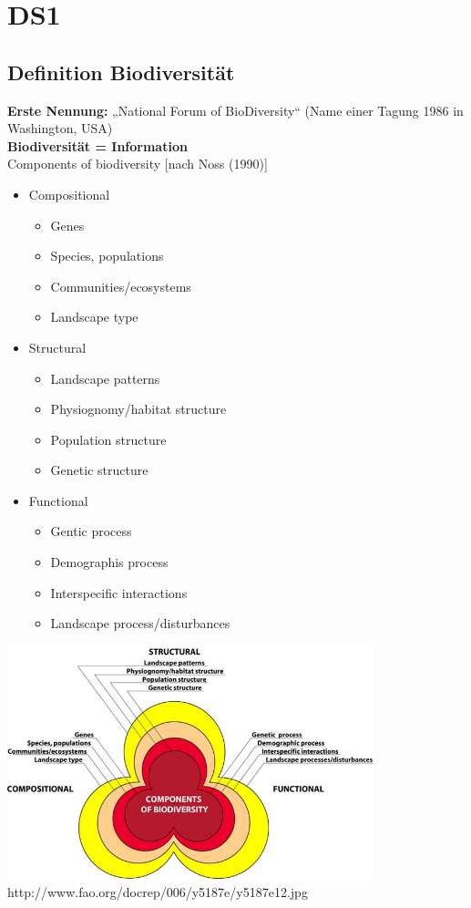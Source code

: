 \section{DS1}
\subsection{Definition Biodiversität}
\textbf{Erste Nennung:} „National Forum of BioDiversity“ (Name einer Tagung 1986 in Washington, USA)\\
\textbf{Biodiversität = Information}\\
Components of biodiversity [nach Noss (1990)]
\begin{itemize}
	\item Compositional
	\begin{itemize}
		\item Genes
		\item Species, populations
		\item Communities/ecosystems
		\item Landscape type
	\end{itemize}
	\item Structural
	\begin{itemize}
		\item Landscape patterns
		\item Physiognomy/habitat structure
		\item Population structure
		\item Genetic structure
	\end{itemize}
	\item Functional
	\begin{itemize}
		\item Gentic process
		\item Demographis process
		\item Interspecific interactions
		\item Landscape process/disturbances
	\end{itemize}
\end{itemize}

\includegraphics[width=0.8\textwidth]{lectures/DS1/pix/y5187e12.jpg}\\
http://www.fao.org/docrep/006/y5187e/y5187e12.jpg

